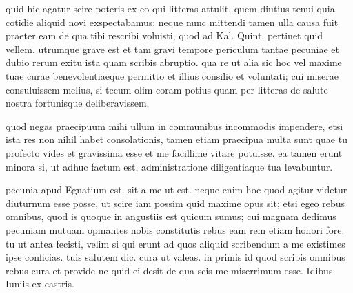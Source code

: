 


 quid hic agatur scire poteris ex eo qui litteras attulit. quem diutius tenui quia cotidie aliquid novi exspectabamus; neque nunc mittendi tamen ulla causa fuit praeter eam de qua tibi rescribi voluisti, quod ad Kal. Quint. pertinet quid vellem. utrumque grave est et tam gravi tempore periculum tantae pecuniae et dubio rerum exitu ista quam scribis abruptio. qua re ut alia sic hoc vel maxime tuae curae benevolentiaeque permitto et illius consilio et voluntati; cui miserae consuluissem melius, si tecum olim coram potius quam per litteras de salute nostra fortunisque deliberavissem.

 quod negas praecipuum mihi ullum in communibus incommodis impendere, etsi ista res non nihil habet consolationis, tamen etiam praecipua multa sunt quae tu profecto vides et gravissima esse et me facillime vitare potuisse. ea tamen erunt minora si, ut adhuc factum est, administratione diligentiaque tua levabuntur.

 pecunia apud Egnatium est. sit a me ut est. neque enim hoc quod agitur videtur diuturnum esse posse, ut scire iam possim quid maxime opus sit; etsi egeo rebus omnibus, quod is quoque in angustiis est quicum sumus; cui magnam dedimus pecuniam mutuam opinantes nobis constitutis rebus eam rem etiam honori fore. tu ut antea fecisti, velim si qui erunt ad quos aliquid scribendum a me existimes ipse conficias. tuis salutem dic. cura ut valeas. in primis id quod scribis omnibus rebus cura et provide ne quid ei desit de qua scis me miserrimum esse. Idibus Iuniis ex castris.
